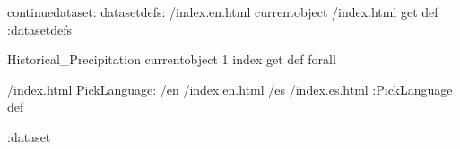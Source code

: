 \begin{ingrid}
continuedataset:
datasetdefs:
/index.en.html currentobject /index.html get def
:datasetdefs

{ Historical_Precipitation } { currentobject 1 index get def } forall

/index.html {
PickLanguage:
/en /index.en.html
/es /index.es.html
:PickLanguage
} def

:dataset
\end{ingrid}
